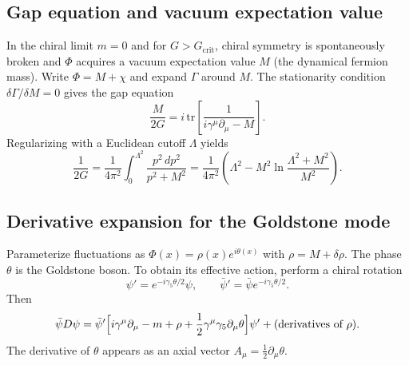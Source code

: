 \documentclass[11pt]{article}
\begin{document}
\subsection*{Gap equation and vacuum expectation value}
In the chiral limit \(m=0\) and for \(G > G_{\text{crit}}\), chiral symmetry is spontaneously broken and \(\Phi\) acquires a vacuum expectation value \(M\) (the dynamical fermion mass). Write \(\Phi = M + \chi\) and expand \(\Gamma\) around \(M\). The stationarity condition \(\delta\Gamma/\delta M = 0\) gives the gap equation
\begin{equation}
\frac{M}{2G} = i\,\text{tr}\!\left[\frac{1}{i\gamma^\mu\partial_\mu - M}\right].
\end{equation}
Regularizing with a Euclidean cutoff \(\Lambda\) yields
\begin{equation}\label{eq:gap}
\frac{1}{2G} = \frac{1}{4\pi^2}\int_0^{\Lambda^2}\!\frac{p^2\,dp^2}{p^2+M^2}
= \frac{1}{4\pi^2}\left(\Lambda^2 - M^2\ln\frac{\Lambda^2+M^2}{M^2}\right).
\end{equation}

\subsection*{Derivative expansion for the Goldstone mode}
Parameterize fluctuations as \(\Phi(x) = \rho(x)e^{i\theta(x)}\) with \(\rho = M + \delta\rho\). The phase \(\theta\) is the Goldstone boson. To obtain its effective action, perform a chiral rotation
\begin{equation}
\psi' = e^{-i\gamma_5\theta/2}\psi,\qquad \bar{\psi}' = \bar{\psi}e^{-i\gamma_5\theta/2}.
\end{equation}
Then
\begin{equation}
\bar{\psi}D\psi = \bar{\psi}'\Bigl[i\gamma^\mu\partial_\mu - m + \rho + \frac{1}{2}\gamma^\mu\gamma_5\partial_\mu\theta\Bigr]\psi' + \text{(derivatives of }\rho\text{)}.
\end{equation}
The derivative of \(\theta\) appears as an axial vector \(A_\mu = \frac{1}{2}\partial_\mu\theta\).
\end{document}
